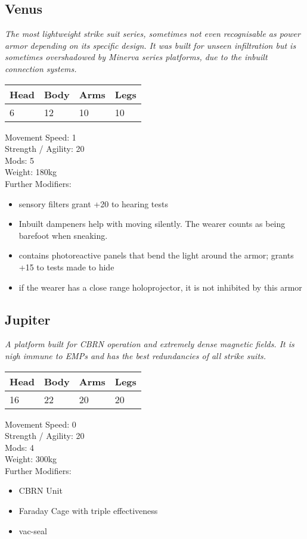\documentclass[12pt,a4paper,openany]{book}
\begin{document}
	\subsection{Venus}
	\textit{The most lightweight strike suit series, sometimes not even recognisable as power armor depending on its specific design. It was built for unseen infiltration but is sometimes overshadowed by Minerva series platforms, due to the inbuilt connection systems.}\par
	\begin{tabular}{|l|l|l|l|}
		\hline
		Head & Body & Arms & Legs\\
		\hline
		6 & 12 & 10 & 10\\
		\hline
	\end{tabular}
	\par
	Movement Speed: 1\\
	Strength / Agility: 20\\
	Mods: 5\\
	Weight: 180kg\\
	Further Modifiers:
	\vspace{-8mm}
	\begin{itemize}
		\setlength\itemsep{-8mm}
		\item sensory filters grant +20 to hearing tests
		\item Inbuilt dampeners help with moving silently. The wearer counts as being barefoot when sneaking.
		\item contains photoreactive panels that bend the light around the armor; grants +15 to tests made to hide
		\item if the wearer has a close range holoprojector, it is not inhibited by this armor
	\end{itemize}
	\par
	\subsection{Jupiter}
	\textit{A platform built for CBRN operation and extremely dense magnetic fields. It is nigh immune to EMPs and has the best redundancies of all strike suits.}\par
	\begin{tabular}{|l|l|l|l|}
		\hline
		Head & Body & Arms & Legs\\
		\hline
		16 & 22 & 20 & 20\\
		\hline
	\end{tabular}
	\par
	Movement Speed: 0\\
	Strength / Agility: 20\\
	Mods: 4\\
	Weight: 300kg\\
	Further Modifiers:
	\vspace{-8mm}
	\begin{itemize}
		\setlength\itemsep{-8mm}
		\item CBRN Unit
		\item Faraday Cage with triple effectiveness
		\item vac-seal
	\end{itemize}
	\par
	
\end{document}
